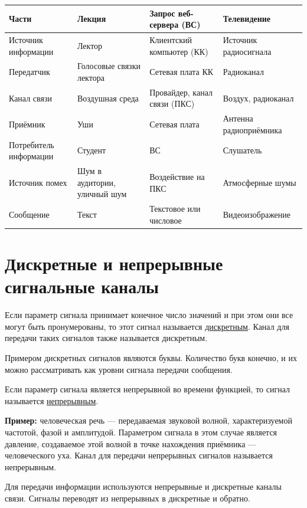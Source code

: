 \documentclass[a4paper, 12pt]{article}
\begin{document}
\begin{center}
\begin{tabularx}{\textwidth}{|X|X|X|X|}
\hline
\textbf{Части} & \textbf{Лекция} & \textbf{Запрос веб-сервера (ВС)} & \textbf{Телевидение} \\
\hline
Источник информации & Лектор & Клиентский компьютер (КК) & Источник радиосигнала \\
\hline
Передатчик & Голосовые связки лектора & Сетевая плата КК & Радиоканал \\
\hline
Канал связи & Воздушная среда & Провайдер, канал связи (ПКС) & Воздух, радиоканал \\
\hline
Приёмник & Уши & Сетевая плата & Антенна радиоприёмника \\
\hline
Потребитель информации & Студент & ВС & Слушатель \\
\hline
Источник помех & Шум в аудитории, уличный шум & Воздействие на ПКС & Атмосферные шумы \\
\hline
Сообщение & Текст & Текстовое или числовое & Видеоизображение \\
\hline
\end{tabularx}
\end{center}

\section{Дискретные и непрерывные сигнальные каналы}

Если параметр сигнала принимает конечное число значений и при этом они все
могут быть пронумерованы, то этот сигнал называется \underline{дискретным}.
Канал для передачи таких сигналов также называется дискретным.

Примером дискретных сигналов являются буквы. Количество букв конечно, и их
можно рассматривать как уровни сигнала передачи сообщения.

Если параметр сигнала является непрерывной во времени функцией, то сигнал
называется \underline{непрерывным}.

\textbf{Пример:} человеческая речь --- передаваемая звуковой волной,
характеризуемой частотой, фазой и амплитудой. Параметром сигнала в этом
случае является давление, создаваемое этой волной в точке нахождения
приёмника --- человеческого уха. Канал для передачи непрерывных сигналов
называется непрерывным.

Для передачи информации используются непрерывные и дискретные каналы связи.
Сигналы переводят из непрерывных в дискретные и обратно.
\end{document}
